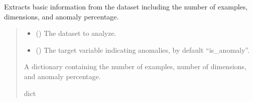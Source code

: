 \documentclass[letterpaper,10pt,english]{sphinxmanual}
\begin{document}
\begin{fulllineitems}
\label{\detokenize{domain.services:domain.services.metrics.file_info}}
\pysigstartsignatures
{}
\pysigstopsignatures
\sphinxAtStartPar
Extracts basic information from the dataset including the number of examples, dimensions, and anomaly percentage.
\begin{quote}\begin{description}
\begin{itemize}
\item {} 
\sphinxAtStartPar
{} () \textendash{} The dataset to analyze.

\item {} 
\sphinxAtStartPar
{} (\sphinxstyleliteralemphasis{\sphinxupquote{, }}) \textendash{} The target variable indicating anomalies, by default “is\_anomaly”.

\end{itemize}

\sphinxAtStartPar
A dictionary containing the number of examples, number of dimensions, and anomaly percentage.

\sphinxAtStartPar
dict

\end{description}\end{quote}

\end{fulllineitems}

\end{document}
